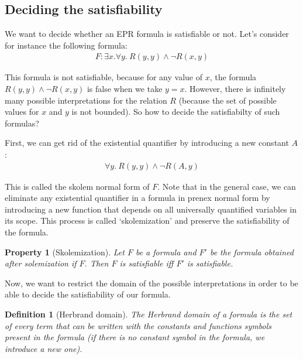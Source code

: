 \documentclass[11pt,a4paper,oldfontcommands]{memoir}
\newtheorem*{definition}{Definition}
\newtheorem*{property}{Property}
\begin{document}
        \subsection{Deciding the satisfiability}

        We want to decide whether an EPR formula is satisfiable or not. Let's consider for instance the following formula:
        \begin{align*}
            F: \exists x. \forall y. \ R(y,y) \land \neg R(x,y)
        \end{align*}

        This formula is not satisfiable, because for any value of \(x\), the formula \(R(y,y) \land \neg R(x,y)\) is false when we take \(y=x\).
        However, there is infinitely many possible interpretations for the relation \(R\) (because the set of possible values for \(x\) and \(y\) is not bounded).
        So how to decide the satisfiabilty of such formulas?

        First, we can get rid of the existential quantifier by introducing a new constant \(A\):
        \begin{align*}
            \forall y. \ R(y,y) \land \neg R(A,y)
        \end{align*}

        This is called the skolem normal form of \(F\).
        Note that in the general case, we can eliminate any existential quantifier in a formula in prenex normal form by introducing a new function
        that depends on all universally quantified variables in its scope. This process is called `skolemization' and preserve the satisfiability of the formula.

        \begin{property}[Skolemization]
            Let \(F\) be a formula and \(F'\) be the formula obtained after solemization if \(F\). Then \(F\) is satisfiable iff \(F'\) is satisfiable.
        \end{property}

        Now, we want to restrict the domain of the possible interpretations in order to be able to decide the satisfiability of our formula.

        \begin{definition}[Herbrand domain]
            The Herbrand domain of a formula is the set of every term that can be written with the constants and functions symbols present in the formula
            (if there is no constant symbol in the formula, we introduce a new one).
        \end{definition}
\end{document}
